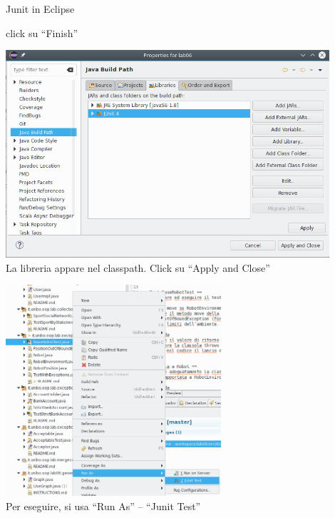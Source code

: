 \documentclass[xcolor=dvipsnames,presentation]{beamer}
\begin{document}
\begin{frame}[allowframebreaks]{Junit in Eclipse}
\begin{center}
    click su ``Finish''
  \end{center}
  \begin{center}
    \includegraphics[width=0.9\textwidth]{junit/e4}\\
    La libreria appare nel classpath. Click su ``Apply and Close''
  \end{center}
  \begin{center}
    \includegraphics[width=0.6\textwidth]{junit/run}\\
    Per eseguire, si usa ``Run As'' -- ``Junit Test''
  \end{center}
\end{frame}
\end{document}
